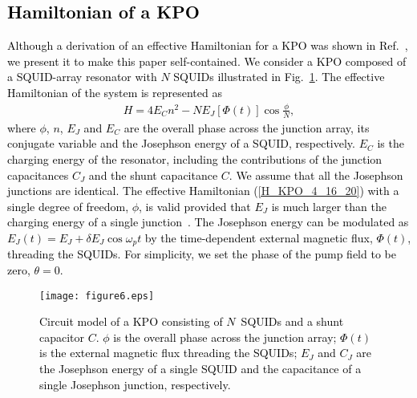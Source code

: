 \documentclass[%
 reprint,
 amsmath,amssymb,
 aps,
pra,
]{revtex4-2}
\begin{document}
\textcolor{black}{
\section{Hamiltonian of a KPO}
\label{Hamiltonian of a parametron2}}
\textcolor{black}{
Although a derivation of an effective Hamiltonian for a KPO was shown in Ref.~\cite{Wang2019},
we present it to make this paper self-contained.
We consider a KPO composed of a SQUID-array resonator with $N$ SQUIDs illustrated in  Fig.~\ref{KPO_system_6_1_20}.
The effective Hamiltonian of the system is represented as
\begin{eqnarray}
H= 4E_C n^2 - NE_J[\Phi(t)] \cos\frac{\phi}{N},
\label{H_KPO_4_16_20}
\end{eqnarray}
where $\phi$, $n$, $E_J$ and $E_C$ are the overall phase across the junction array, its conjugate variable and the Josephson energy of a SQUID, respectively. 
$E_C$ is the charging energy of the resonator, including the contributions of the junction capacitances $C_J$ and the shunt capacitance $C$.
We assume that all the Josephson junctions are identical.
The effective Hamiltonian (\ref{H_KPO_4_16_20}) with a single degree of freedom, $\phi$, is valid provided that $E_J$ is much larger than the charging energy of a single junction~\cite{Frattini2017,Noguchi2020}.
The Josephson energy can be modulated as $E_J(t)=E_J+\delta E_J \cos\omega_p t$ by the time-dependent external magnetic flux, $\Phi(t)$, threading the SQUIDs.
For simplicity, we set the phase of the pump field to be zero, $\theta=0$.
}

\begin{figure}
\begin{center}
\texttt{[image: figure6.eps]}
\end{center}
\caption{
\textcolor{black}{
Circuit model of a KPO consisting of $N$~SQUIDs and a shunt capacitor $C$. 
$\phi$ is the overall phase across the junction array;  $\Phi(t)$ is the external magnetic flux threading the SQUIDs; $E_J$ and $C_J$ are the Josephson energy of a single SQUID and the capacitance of a single Josephson junction, respectively.  
}
}
\label{KPO_system_6_1_20}
\end{figure}
\end{document}
